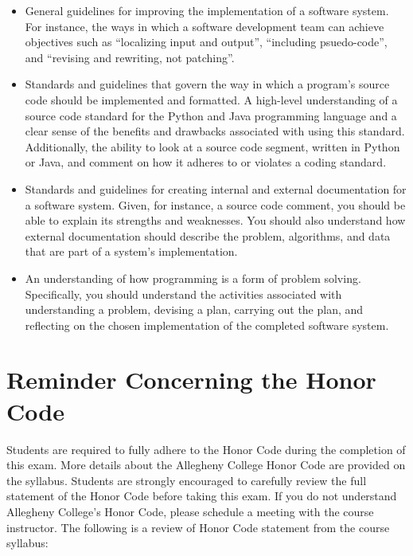 \documentclass[11pt]{article}
\begin{document}
\begin{itemize}
  \item General guidelines for improving the implementation of a software
    system. For instance, the ways in which a software development team can
    achieve objectives such as ``localizing input and output'', ``including
    psuedo-code'', and ``revising and rewriting, not patching''.

  \item Standards and guidelines that govern the way in which a program's source
    code should be implemented and formatted. A high-level understanding of a
    source code standard for the Python and Java programming language and a
    clear sense of the benefits and drawbacks associated with using this
    standard. Additionally, the ability to look at a source code segment,
    written in Python or Java, and comment on how it adheres to or violates a
    coding standard.

  \item Standards and guidelines for creating internal and external
    documentation for a software system. Given, for instance, a source code
    comment, you should be able to explain its strengths and weaknesses. You
    should also understand how external documentation should describe the
    problem, algorithms, and data that are part of a system's implementation.

  \item An understanding of how programming is a form of problem solving.
    Specifically, you should understand the activities associated with
    understanding a problem, devising a plan, carrying out the plan, and
    reflecting on the chosen implementation of the completed software system.

\end{itemize}

\section*{Reminder Concerning the Honor Code}

\noindent Students are required to fully adhere to the Honor Code during the
completion of this exam. More details about the Allegheny College Honor Code are
provided on the syllabus. Students are strongly encouraged to carefully review
the full statement of the Honor Code before taking this exam. If you do not
understand Allegheny College's Honor Code, please schedule a meeting with the
course instructor. The following is a review of Honor Code statement from the
course syllabus:
\end{document}
